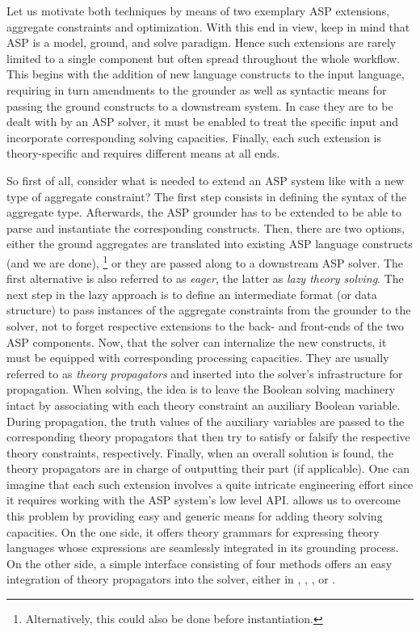 Let us motivate both techniques by means of two exemplary ASP extensions, aggregate constraints and optimization.
%
With this end in view,
keep in mind that ASP is a model, ground, and solve paradigm.
Hence such extensions are rarely limited to a single component
but often spread throughout the whole workflow.
This begins with the addition of new language constructs to the input language,
requiring in turn amendments to the grounder as well as
syntactic means for passing the ground constructs to a downstream system.
In case they are to be dealt with by an ASP solver,
it must be enabled to treat the specific input and incorporate corresponding solving capacities.
%
Finally,
each such extension is theory-specific and requires different means at all ends.

So first of all, consider what is needed to extend an ASP system like \clingo{} with a new type of aggregate constraint?
The first step consists in defining the syntax of the aggregate type.
Afterwards, the ASP grounder has to be extended to be able to parse and instantiate the corresponding constructs.
Then, there are two options, either the ground aggregates are translated into existing ASP language constructs (and we are done),%
\footnote{Alternatively, this could also be done before instantiation.}
or they are passed along to a downstream ASP solver.
The first alternative is also referred to as \emph{eager}, the latter as \emph{lazy theory solving}.
The next step in the lazy approach is to define an intermediate format (or data structure) to pass instances of
the aggregate constraints from the grounder to the solver,
not to forget respective extensions to the back- and front-ends of the two ASP components.
Now, that the solver can internalize the new constructs, it must be equipped with corresponding processing capacities.
They are usually referred to as \emph{theory propagators} and inserted into the solver's infrastructure for propagation.
When solving, the idea is to leave the Boolean solving machinery intact by associating with each theory constraint
an auxiliary Boolean variable.
During propagation, the truth values of the auxiliary variables are passed to the corresponding theory propagators
that then try to satisfy or falsify the respective theory constraints, respectively.
Finally, when an overall solution is found, the theory propagators are in charge of outputting their part (if applicable).
One can imagine that each such extension involves a quite intricate engineering effort
since it requires working with the ASP system's low level API.
%
\clingo{} allows us to overcome this problem by providing easy and generic means for adding theory solving capacities.
On the one side, it offers theory grammars for expressing theory languages whose expressions are seamlessly integrated in its grounding process.
On the other side, a simple interface consisting of four methods offers an easy integration of theory propagators into the solver,
either in \C, \cpp, \lua, or \python.

